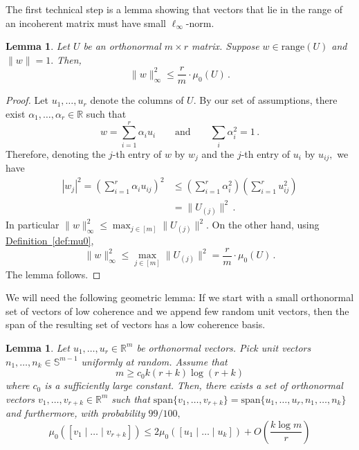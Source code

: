 \documentclass[letterpaper,11pt]{article}
\newtheorem{lemma}[theorem]{Lemma}
\theoremstyle{definition}
\newcommand{\definitionref}[1]{\hyperref[def:#1]{Definition~\ref{def:#1}}}
\newcommand{\equationlabel}[1]{\label{eq:#1}}
\newcommand{\lemmalabel}[1]{\label{lem:#1}}
\newcommand{\mper}{\,.}
\renewcommand{\le}{\leqslant}
\renewcommand{\ge}{\geqslant}
\newcommand{\R}{\mathbb{R}}
\newcommand{\range}{\mathrm{range}}
\begin{document}
The first technical step is a lemma showing that vectors that lie in the range
of an incoherent matrix must have small $\ell_\infty$-norm.

\begin{lemma}\lemmalabel{mu0-infty}
Let $U$ be an orthonormal $m\times r$ matrix. Suppose $w\in\range(U)$ and
$\|w\|=1.$ Then,
\[
\|w\|_\infty^2\le \frac rm\cdot\mu_0(U)\mper
\]
\end{lemma}

\begin{proof}
Let $u_1,\dots,u_r$ denote the columns of $U.$ By our set of assumptions, there
exist $\alpha_1,\dots,\alpha_r\in\R$ such that
\[
w = \sum_{i=1}^r \alpha_iu_i
\qquad\text{and}\qquad
\sum_i\alpha_{i}^2=1\mper
\]
Therefore, denoting the
$j$-th entry of $w$ by $w_j$ and the $j$-th entry of $u_i$ by $u_{ij},$ we have
\begin{align*}
|w_j|^2
 = \left(\sum_{i=1}^r\alpha_i u_{i j}\right)^2
& \le \left(\sum_{i=1}^r\alpha_i^2\right)
\left(\sum_{i=1}^ru_{i j}^2\right) \tag{by Cauchy-Schwarz} \\
& = \|U_{(j)}\|^2\mper
\end{align*}
In particular $\|w\|_\infty^2 \le \max_{j\in[m]}\|U_{(j)}\|^2.$
On the other hand,
using \definitionref{mu0},
\[
\|w\|_\infty^2\le \max_{j\in[m]}\|U_{(j)}\|^2
= \frac rm\cdot\mu_0(U)\mper
\]
The lemma follows.
\end{proof}

We will need the following geometric lemma: If we start with a small
orthonormal set of vectors of low coherence and we append few random unit
vectors, then the span of the resulting set of vectors has a low coherence
basis.

\begin{lemma}\lemmalabel{mu0-perturb}
Let $u_1,\dots,u_r\in\R^m$ be orthonormal vectors. Pick unit vectors
$n_1,\dots,n_k\in\mathbb{S}^{m-1}$ uniformly at random. Assume that
\begin{equation}\equationlabel{mlarge}
m\ge c_0 k(r+k)\log(r+k)
\end{equation}
where $c_0$ is a sufficiently large constant.
Then, there exists a
set of orthonormal vectors $v_1,\dots,v_{r+k}\in\R^m$ such that
$\mathrm{span}\{v_1,\dots,v_{r+k}\}=\mathrm{span}\{u_1,\dots,u_r,n_1,\dots,n_k\}$ and
furthermore, with probability $99/100,$
\[
\mu_0([v_1\mid \dots\mid v_{r+k}])
\le
2\mu_0([u_1\mid\dots\mid u_k])+ O\left( \frac{k\log m}{r}\right)
\]
\end{lemma}
\end{document}
